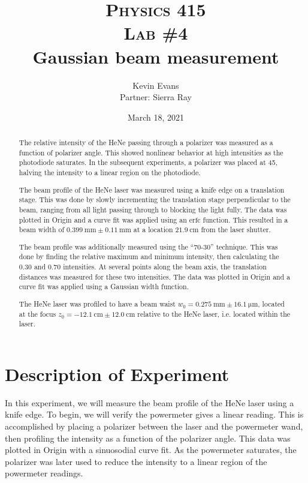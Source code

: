 \documentclass[notitlepage]{report}
\title{
	\textsc{ \small
		Physics 415
	} \\
	{\textsc{\small Lab \#4}} \\
	Gaussian beam measurement
}
\author{Kevin Evans \\ Partner: Sierra Ray}
\date{March 18, 2021}
\begin{document}
	\begin{titlingpage}
		\maketitle
		\begin{abstract}
			\noindent 
			The relative intensity of the HeNe passing through a polarizer was measured as a function of polarizer angle. This showed nonlinear behavior at high intensities as the photodiode saturates. In the subsequent experiments, a polarizer was placed at \SI{45}{\deg}, halving the intensity to a linear region on the photodiode.
			
			The beam profile of the HeNe laser was measured using a knife edge on a translation stage. This was done by slowly incrementing the translation stage perpendicular to the beam, ranging from all light passing through to blocking the light fully. The data was plotted in Origin and a curve fit was applied using an $\mathrm{erfc}$ function. This resulted in a beam width of $\SI{0.399}{\mm} \pm \SI{0.11}{\mm}$ at a location $\SI{21.9}{\centi\meter}$ from the laser shutter.
			
			The beam profile was additionally measured using the ``70-30'' technique. This was done by finding the relative maximum and minimum intensity, then calculating the $0.30$ and $0.70$ intensities. At several points along the beam axis, the translation distances was measured for these two intensities. The data was plotted in Origin and a curve fit was applied using a Gaussian width function.
			
			The HeNe laser was profiled to have a beam waist $w_0=\SI{0.275}{\mm} \pm \SI{16.1}{\um}$, located at the focus $z_0 = -\SI{12.1}{\centi\meter} \pm \SI{12.0}{\centi\meter}$ relative to the HeNe laser, i.e. located within the laser.
		\end{abstract}
	\end{titlingpage}

	\section{Description of Experiment}
	In this experiment, we will measure the beam profile of the HeNe laser using a knife edge. To begin, we will verify the powermeter gives a linear reading. This is accomplished by placing a polarizer between the laser and the powermeter wand, then profiling the intensity as a function of the polarizer angle. This data was plotted in Origin with a sinuosodial curve fit. As the powermeter saturates, the polarizer was later used to reduce the intensity to a linear region of the powermeter readings. 
	
\end{document}
